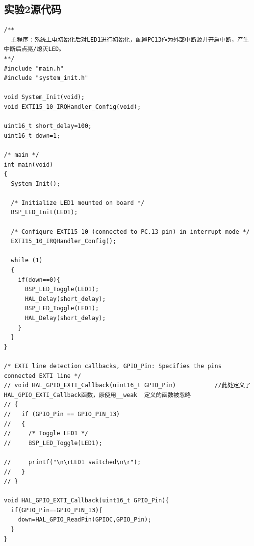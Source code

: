 ﻿\documentclass[UTF8,12pt]{article}
\begin{document}
\subsection{实验2源代码}
\begin{lstlisting}[frame=shadowbox]
/**
  主程序：系统上电初始化后对LED1进行初始化，配置PC13作为外部中断源并开启中断，产生中断后点亮/熄灭LED。
**/
#include "main.h"
#include "system_init.h"

void System_Init(void);
void EXTI15_10_IRQHandler_Config(void);

uint16_t short_delay=100;
uint16_t down=1;

/* main */
int main(void)
{
  System_Init();
  
  /* Initialize LED1 mounted on board */
  BSP_LED_Init(LED1);
  
  /* Configure EXTI15_10 (connected to PC.13 pin) in interrupt mode */
  EXTI15_10_IRQHandler_Config();
  
  while (1)
  {
    if(down==0){
      BSP_LED_Toggle(LED1);
      HAL_Delay(short_delay);
      BSP_LED_Toggle(LED1);
      HAL_Delay(short_delay);
    }
  }
}

/* EXTI line detection callbacks, GPIO_Pin: Specifies the pins connected EXTI line */
// void HAL_GPIO_EXTI_Callback(uint16_t GPIO_Pin)			//此处定义了HAL_GPIO_EXTI_Callback函数，原使用__weak  定义的函数被忽略
// {
//   if (GPIO_Pin == GPIO_PIN_13)
//   {
//     /* Toggle LED1 */
//     BSP_LED_Toggle(LED1);
    
//     printf("\n\rLED1 switched\n\r");
//   }
// }

void HAL_GPIO_EXTI_Callback(uint16_t GPIO_Pin){
  if(GPIO_Pin==GPIO_PIN_13){
    down=HAL_GPIO_ReadPin(GPIOC,GPIO_Pin);
  }
}
\end{lstlisting}
\end{document}
